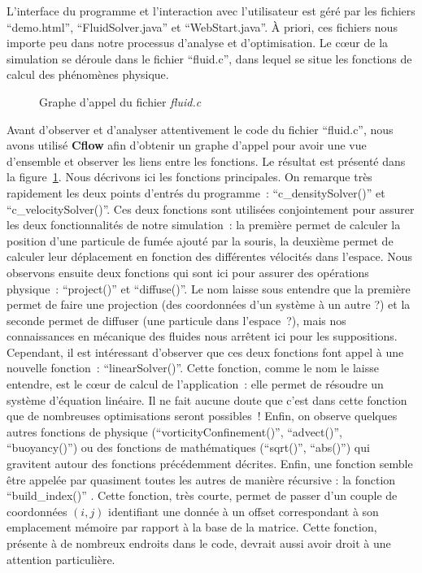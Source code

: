 \documentclass[12pt,a4paper]{article}
\makeatletter
\DeclareRobustCommand*{\escapeus}[1]{
    \begingroup\@activeus\scantokens{#1\endinput}\endgroup}
\makeatother
\begin{document}
L’interface du programme et l’interaction avec l’utilisateur est géré par les
fichiers \enquote{demo.html}, \enquote{FluidSolver.java} et
\enquote{WebStart.java}. À priori, ces fichiers nous importe peu dans notre
processus d’analyse et d’optimisation. Le cœur de la simulation se déroule dans
le fichier \enquote{fluid.c}, dans lequel se situe les fonctions de calcul des
phénomènes physique.

\begin{figure}[h]
    \centering
    {
        \scriptsize
        \escapeus{}
    }
    \caption{Graphe d'appel du fichier \textit{fluid.c}}
    \label{fig.analyze.callgraph}
\end{figure}

Avant d'observer et d’analyser attentivement le code du fichier
\enquote{fluid.c}, nous avons utilisé \textbf{Cflow} afin d’obtenir un graphe
d’appel pour avoir une vue d’ensemble et observer les liens entre les fonctions.
Le résultat est présenté dans la figure~\ref{fig.analyze.callgraph}. Nous
décrivons ici les fonctions principales. On remarque très rapidement les deux
points d’entrés du programme : \enquote{c\_densitySolver()} et
\enquote{c\_velocitySolver()}. Ces deux fonctions sont utilisées conjointement
pour assurer les deux fonctionnalités de notre simulation : la première permet
de calculer la position d’une particule de fumée ajouté par la souris, la
deuxième permet de calculer leur déplacement en fonction des différentes
vélocités dans l’espace. Nous observons ensuite deux fonctions qui sont ici pour
assurer des opérations physique : \enquote{project()} et \enquote{diffuse()}. Le
nom laisse sous entendre que la première permet de faire une projection (des
coordonnées d’un système à un autre ?) et la seconde permet de diffuser (une
particule dans l’espace ?), mais nos connaissances en mécanique des fluides nous
arrêtent ici pour les suppositions. Cependant, il est intéressant d’observer que
ces deux fonctions font appel à une nouvelle fonction :
\enquote{linearSolver()}. Cette fonction, comme le nom le laisse entendre, est
le cœur de calcul de l’application : elle permet de résoudre un système
d’équation linéaire. Il ne fait aucune doute que c’est dans cette fonction que
de nombreuses optimisations seront possibles ! Enfin, on observe quelques autres
fonctions de physique (\enquote{vorticityConfinement()}, \enquote{advect()},
\enquote{buoyancy()}) ou des fonctions de mathématiques (\enquote{sqrt()},
\enquote{abs()}) qui gravitent autour des fonctions précédemment décrites.
Enfin, une fonction semble être appelée par quasiment toutes les autres de
manière récursive : la fonction \enquote{build\_index()} . Cette fonction, très
courte, permet de passer d’un couple de coordonnées $(i, j)$ identifiant une
donnée à un offset correspondant à son emplacement mémoire par rapport à la base
de la matrice. Cette fonction, présente à de nombreux endroits dans le code,
devrait aussi avoir droit à une attention particulière.
\end{document}
